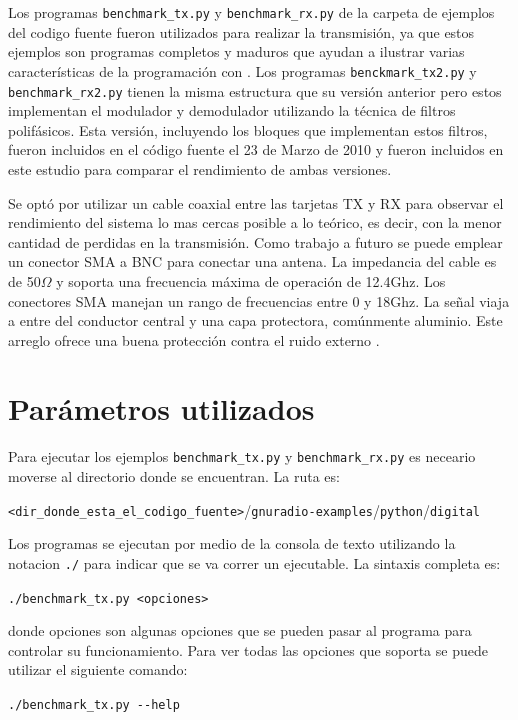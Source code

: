 Los programas \verb|benchmark_tx.py| y \verb|benchmark_rx.py| de la carpeta de ejemplos del codigo
fuente fueron utilizados para realizar la transmisi\'on, ya que estos ejemplos son programas
completos y maduros que ayudan a ilustrar varias caracter\'isticas de la programaci\'on con
\gnuradio. Los programas \verb|benckmark_tx2.py| y \verb|benchmark_rx2.py| tienen la misma
estructura que su versi\'on anterior pero estos implementan el modulador y demodulador utilizando la
t\'ecnica de filtros polif\'asicos. Esta versi\'on, incluyendo los bloques que implementan estos
filtros, fueron incluidos en el c\'odigo fuente el 23 de Marzo de 2010 y fueron incluidos en este
estudio para comparar el rendimiento de ambas versiones.

Se opt\'o por utilizar un cable coaxial entre las tarjetas TX y RX para observar el rendimiento del sistema lo mas cercas posible
a lo te\'orico, es decir, con la menor cantidad de perdidas en la transmisi\'on. Como trabajo a futuro se puede emplear un
conector SMA a BNC para conectar una antena. La impedancia del cable es de 50$\Omega$ y soporta una frecuencia m\'axima de
operaci\'on de 12.4Ghz. Los conectores SMA manejan un rango de frecuencias entre 0 y 18Ghz. La se\~nal viaja a entre del conductor
central y una capa protectora, com\'unmente aluminio. Este arreglo ofrece una buena protecci\'on contra el ruido externo \cite{coax}.


\section{Par\'ametros utilizados}
\label{sec:params}

Para ejecutar los ejemplos \verb|benchmark_tx.py| y \verb|benchmark_rx.py| es neceario moverse al
directorio donde se encuentran. La ruta es:
\begin{center}
\verb|<dir_donde_esta_el_codigo_fuente>|/\verb|gnuradio-examples|/\verb|python|/\verb|digital|
\end{center}
Los programas se ejecutan por medio de la consola de texto utilizando la notacion \verb|./| para
indicar que se va correr un ejecutable. La sintaxis completa es:
\begin{center}
\verb|./benchmark_tx.py <opciones>|
\end{center}
donde opciones son algunas opciones que se pueden pasar al programa para controlar su
funcionamiento. Para ver todas las opciones que soporta se puede utilizar el siguiente comando:
\begin{center}
\verb|./benchmark_tx.py --help|
\end{center}

